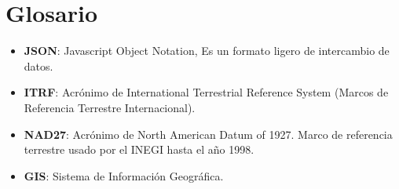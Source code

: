 \chapter {Glosario}
    \begin{itemize}
		\item \textbf{JSON}: Javascript Object Notation, Es un formato ligero de intercambio de datos.
		\item \textbf{ITRF}: Acrónimo de International Terrestrial Reference System (Marcos de Referencia Terrestre Internacional).
		\item \textbf{NAD27}: Acrónimo de North American Datum of 1927. Marco de referencia terrestre usado por el INEGI hasta el año 1998.
		\item \textbf{GIS}: Sistema de Información Geográfica.
	\end{itemize}